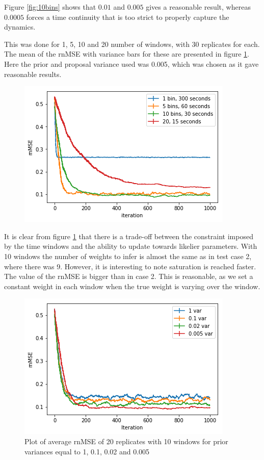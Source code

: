 Figure \ref{fig:10bins} shows that $0.01$ and $0.005$ gives a reasonable result, whereas $0.0005$ forces a time continuity that is too strict to properly capture the dynamics.

This was done for 1, 5, 10 and 20 number of windows, with 30 replicates for each. The mean of the rnMSE with variance bars for these are presented in figure \ref{fig:MSE_bins}. Here the prior and proposal variance used was 0.005, which was chosen as it gave reasonable results. 

\begin{figure}[hbt!]
\caption{}
\label{fig:MSE_bins}
    \centering
    \includegraphics[scale=0.6]{fig/MSE_bins.png}
\end{figure}


It is clear from figure \ref{fig:MSE_bins} that there is a trade-off between the constraint imposed by the time windows and the ability to update towards likelier parameters. With 10 windows the number of weights to infer is almost the same as in test case 2, where there was 9. However, it is interesting to note saturation is reached faster. The value of the rnMSE is bigger than in case 2. This is reasonable, as we set a constant weight in each window when the true weight is varying over the window. 

\begin{figure}[hbt!]
\caption{Plot of average rnMSE of 20 replicates with 10 windows for prior variances equal to 1, 0.1, 0.02 and 0.005}
\label{fig:prior_variance}
    \centering
    \includegraphics[scale=0.6]{fig/Prior_variance_plot.png}
\end{figure}


\cleardoublepage
